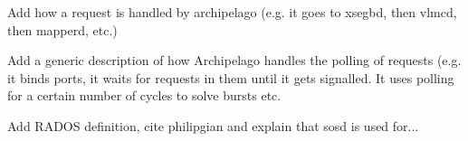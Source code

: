 \begin{comment}
Also, ports are designed to be considered as paths. That is, when a request is 
sent from one port to another...

\section{Request flow example}

We have bench xseg which works like so:

\begin{enumerate}
	\item Get request
	\item Prepare request
	\item Create chunk
	\item Allocate peer request
	\item Set request (xhash)
	\item Submit request
\end{enumerate}

\subsection{Get request}\label{sec:get-req-archip}

Explain here about xq or in xtypes?
\end{comment}

\todo Add how a request is handled by archipelago (e.g. it goes to xsegbd, then 
vlmcd, then mapperd, etc.)

\todo Add a generic description of how Archipelago handles the polling of 
requests (e.g. it binds ports, it waits for requests in them until it gets 
signalled. It uses polling for a certain number of cycles to solve bursts etc.

\todo Add RADOS definition, cite philipgian and explain that sosd is used 
for...

